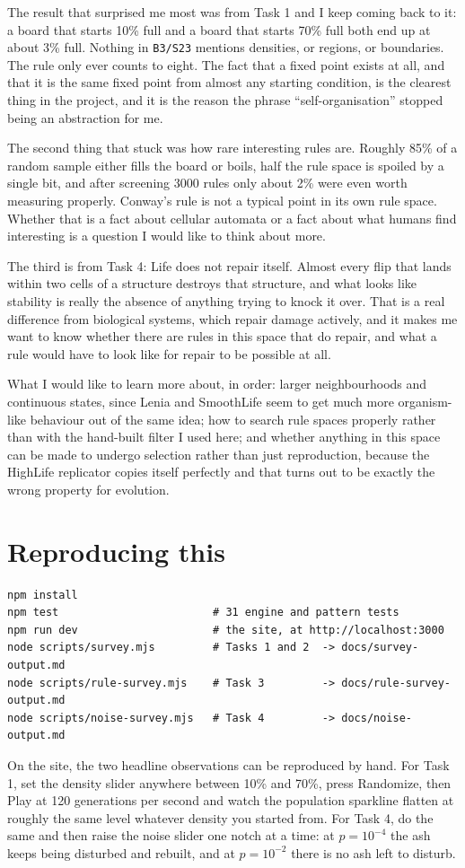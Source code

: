 \documentclass[11pt]{article}
\newcommand{\rulename}[1]{\texttt{#1}}
\begin{document}
The result that surprised me most was from Task 1 and I keep coming back to it: a board that starts
10\% full and a board that starts 70\% full both end up at about 3\% full. Nothing in
\rulename{B3/S23} mentions densities, or regions, or boundaries. The rule only ever counts to eight.
The fact that a fixed point exists at all, and that it is the same fixed point from almost any
starting condition, is the clearest thing in the project, and it is the reason the phrase
``self-organisation'' stopped being an abstraction for me.

The second thing that stuck was how rare interesting rules are. Roughly 85\% of a random sample
either fills the board or boils, half the rule space is spoiled by a single bit, and after screening
3000 rules only about 2\% were even worth measuring properly. Conway's rule is not a typical point in
its own rule space. Whether that is a fact about cellular automata or a fact about what humans find
interesting is a question I would like to think about more.

The third is from Task 4: Life does not repair itself. Almost every flip that lands within
two cells of a structure destroys that structure, and what looks like stability is really the
absence of anything trying to knock it over. That is a real difference from biological systems,
which repair damage actively, and it makes me want to know whether there are rules in this space that
do repair, and what a rule would have to look like for repair to be possible at all.

What I would like to learn more about, in order: larger neighbourhoods and continuous states, since
Lenia and SmoothLife seem to get much more organism-like behaviour out of the same idea; how to
search rule spaces properly rather than with the hand-built filter I used here; and whether anything
in this space can be made to undergo selection rather than just reproduction, because the HighLife
replicator copies itself perfectly and that turns out to be exactly the wrong property for evolution.

\section{Reproducing this}

\begin{verbatim}
npm install
npm test                        # 31 engine and pattern tests
npm run dev                     # the site, at http://localhost:3000
node scripts/survey.mjs         # Tasks 1 and 2  -> docs/survey-output.md
node scripts/rule-survey.mjs    # Task 3         -> docs/rule-survey-output.md
node scripts/noise-survey.mjs   # Task 4         -> docs/noise-output.md
\end{verbatim}

\noindent
On the site, the two headline observations can be reproduced by hand. For Task 1, set the density
slider anywhere between 10\% and 70\%, press Randomize, then Play at 120 generations per second and
watch the population sparkline flatten at roughly the same level whatever density you started from.
For Task 4, do the same and then raise the noise slider one notch at a time: at
$p=10^{-4}$ the ash keeps being disturbed and rebuilt, and at $p=10^{-2}$ there is no ash left to
disturb.
\end{document}
